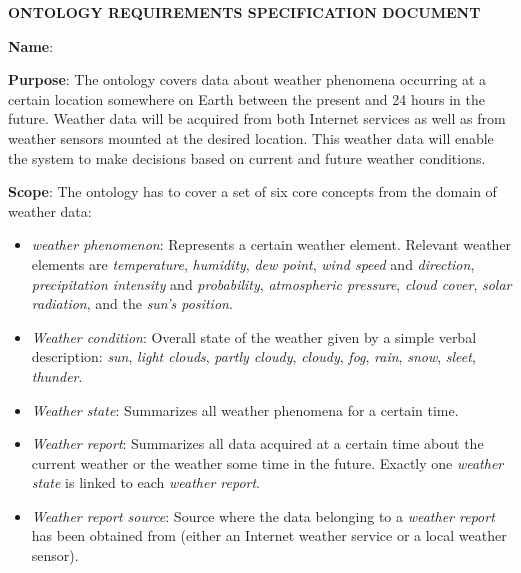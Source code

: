 \vspace{1em}

\begin{mdframed}[linewidth=.6pt]
\setlength{\parindent}{0pt}
\vspace{.3cm}

\MakeUppercase{\textbf{Ontology Requirements Specification Document}}

\vspace{.5cm}

\textbf{Name}: \thinkhomeweather

\vspace{.2cm}

\textbf{Purpose}: The ontology covers data about weather phenomena occurring at a certain location somewhere on Earth between the present and 24 hours in the future. Weather data will be acquired from both Internet services as well as from weather sensors mounted at the desired location. This weather data will enable the \thinkhome system to make decisions based on current and future weather conditions.

\vspace{.2cm}

\textbf{Scope}: The ontology has to cover a set of six core concepts from the domain of weather data:

\begin{itemize}
  \item \emph{weather phenomenon}: Represents a certain weather element. Relevant weather elements are \emph{temperature}, \emph{humidity}, \emph{dew point}, \emph{wind speed} and \emph{direction}, \emph{precipitation intensity} and \emph{probability}, \emph{atmospheric pressure}, \emph{cloud cover}, \emph{solar radiation}, and the \emph{sun's position}.
  \item \emph{Weather condition}: Overall state of the weather given by a simple verbal description: \emph{sun}, \emph{light clouds}, \emph{partly cloudy}, \emph{cloudy}, \emph{fog}, \emph{rain}, \emph{snow}, \emph{sleet}, \emph{thunder}.
  \item \emph{Weather state}: Summarizes all weather phenomena for a certain time. 
  \item \emph{Weather report}: Summarizes all data acquired at a certain time about the current weather or the weather some time in the future. Exactly one \emph{weather state} is linked to each \emph{weather report}.
  \item \emph{Weather report source}: Source where the data belonging to a \emph{weather report} has been obtained from (either an Internet weather service or a local weather sensor).
\end{itemize}


\end{mdframed}
